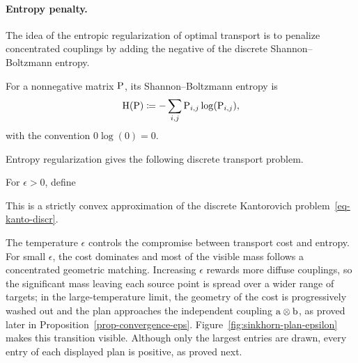 \paragraph{Entropy penalty.}
The idea of the entropic regularization of optimal transport is to penalize concentrated couplings by adding the negative of the discrete Shannon--Boltzmann entropy.

\begin{defn}\label{def-discrete-shannon-boltzmann-entropy}
	For a nonnegative matrix $\P$, its Shannon--Boltzmann entropy is
	\[
		\HD(\P) \eqdef -\sum_{i,j} \P_{i,j} \log(\P_{i,j}),
	\]
	with the convention $0\log(0)=0$.
\end{defn}
Entropy regularization gives the following discrete transport problem.
\begin{defn}\label{def-discrete-entropic-ot}
For $\epsilon>0$, define
\end{defn}
This is a strictly convex approximation of the discrete Kantorovich problem~\eqref{eq-kanto-discr}.

The temperature $\epsilon$ controls the compromise between transport cost and entropy. For small $\epsilon$, the cost dominates and most of the visible mass follows a concentrated geometric matching. Increasing $\epsilon$ rewards more diffuse couplings, so the significant mass leaving each source point is spread over a wider range of targets; in the large-temperature limit, the geometry of the cost is progressively washed out and the plan approaches the independent coupling $\a\otimes\b$, as proved later in Proposition~\ref{prop-convergence-eps}. Figure~\ref{fig:sinkhorn-plan-epsilon} makes this transition visible. Although only the largest entries are drawn, every entry of each displayed plan is positive, as proved next.

